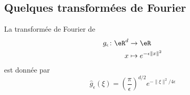 \subsection{Quelques transformées de Fourier}

\begin{lemma}       \label{LEMooPAAJooCsoyAJ}
	La transformée de Fourier de
	\begin{equation}
		\begin{aligned}
			g_{\epsilon}\colon \eR^d & \to \eR                         \\
			x                        & \mapsto  e^{-\epsilon\| x \|^2}
		\end{aligned}
	\end{equation}
	est donnée par
	\begin{equation}
		\hat g_{\epsilon}(\xi)=\left( \frac{ \pi }{ \epsilon } \right)^{d/2} e^{-\| \xi \|^2/4\epsilon}
	\end{equation}
\end{lemma}

